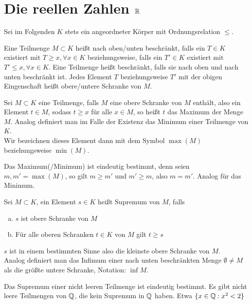     \section{Die reellen Zahlen $\mathbb{R}$} Sei im Folgenden $K$ stets ein angeordneter Körper mit Ordnungsrelation $\le$.
    \begin{defn}
        Eine Teilmenge $M\subset K$ heißt nach oben/unten beschränkt, falls ein $T\in K$ existiert mit $T\ge x,  \forall x\in K$ beziehungsweise, falls ein $T'\in K$ existiert mit $T'\le x,  \forall x\in K$. 
        Eine Teilmenge heißt beschränkt, falls sie nach oben und nach unten beschränkt ist.
        Jedes Element $T$ beziehungsweise $T'$ mit der obigen Eingenschaft heißt obere/untere Schranke von $M$.
    \end{defn}
    \begin{defn}
        Sei $M\subset K$ eine Teilmenge, falls $M$ eine obere Schranke von $M$ enthält, also ein Element $t\in M$, sodass $t\ge x$ für alle $x\in M$, so heißt $t$ das Maximum der Menge $M$.
        Analog definiert man im Falle der Existenz das Minimum einer Teilmenge von $K$. \\ Wir bezeichnen dieses Element dann mit dem Symbol $\max(M)$ beziehungsweise $\min(M)$.
    \end{defn}
    \begin{bem} Das Maximum(/Minimum) ist eindeutig bestimmt, denn seien $m,m'=\max(M)$, so gilt $m\ge m'$ und $m'\ge m$, also $m=m'$. Analog für das Minimum.
    \end{bem}
    \begin{defn}
        Sei $M\subset K$, ein Element $s\in K$ heißt Supremum von $M$, falls 
        \begin{enumerate}[(a)]
            \item $s$ ist obere Schranke von $M$
            \item Für alle oberen Schranken $t\in K$ von $M$ gilt $t\ge s$
        \end{enumerate}
        $s$ ist in einem bestimmten Sinne also die kleinste obere Schranke von $M$. \\ Analog definiert man das Infimum einer nach unten beschränkten Menge $\emptyset \neq M$ als die 
        größte untere Schranke, Notation: $\inf M$.
    \end{defn}
    \begin{bem}
        Das Supremum einer nicht leeren Teilmenge ist eindeutig bestimmt. Es gibt nicht leere Teilmengen von $\mathbb{Q}$, die kein Supremum in $\mathbb{Q}$ haben.
        Etwa $\{x\in \mathbb{Q}: x^2 < 2\}$
    \end{bem}
